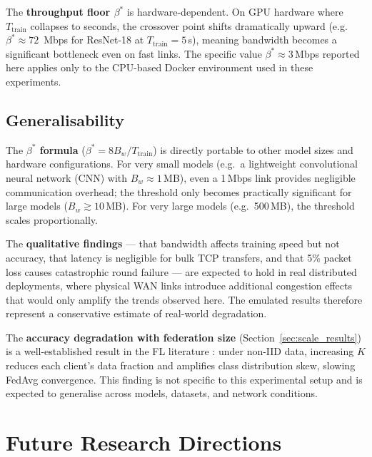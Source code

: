 \documentclass[12pt,a4paper]{report}
\begin{document}
The \textbf{throughput floor $\beta^*$} is hardware-dependent.  On GPU
hardware where $T_{\mathrm{train}}$ collapses to seconds, the crossover
point shifts dramatically upward (e.g.\ $\beta^* \approx 72$~Mbps for
ResNet-18 at $T_{\mathrm{train}} = 5$\,s), meaning bandwidth becomes a
significant bottleneck even on fast links.  The specific value
$\beta^* \approx 3$\,Mbps reported here applies only to the CPU-based
Docker environment used in these experiments.

\section{Generalisability}

The \textbf{$\beta^*$ formula} ($\beta^* = 8 B_w / T_{\mathrm{train}}$)
is directly portable to other model sizes and hardware configurations.
For very small models (e.g.\ a lightweight convolutional neural network
(CNN) with $B_w \approx 1$\,MB), even a 1\,Mbps link provides negligible
communication overhead; the threshold only becomes practically significant
for large models ($B_w \gtrsim 10$\,MB).  For very large models
(e.g.\ 500\,MB), the threshold scales proportionally.

The \textbf{qualitative findings} --- that bandwidth affects training
speed but not accuracy, that latency is negligible for bulk TCP transfers,
and that 5\% packet loss causes catastrophic round failure --- are expected
to hold in real distributed deployments, where physical WAN links introduce
additional congestion effects that would only amplify the trends observed
here.  The emulated results therefore represent a conservative estimate of
real-world degradation.

The \textbf{accuracy degradation with federation size} (Section~\ref{sec:scale_results})
is a well-established result in the FL literature
\citep{li2020federated,li2020fedprox}: under non-IID data, increasing $K$
reduces each client's data fraction and amplifies class distribution skew,
slowing FedAvg convergence.  This finding is not specific to this
experimental setup and is expected to generalise across models, datasets,
and network conditions.

\chapter{Future Research Directions}
\label{ch:future}
\end{document}

